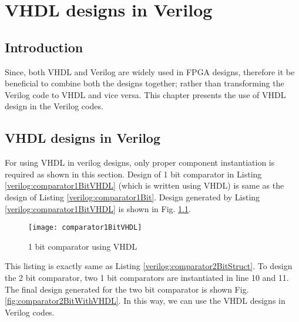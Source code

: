 \chapter{VHDL designs in Verilog} \label{ch:VerilogInVhdl}

\graphicspath{{Chapters/VhdlWithVerilog/Figures/}}


\section{Introduction}
Since, both VHDL and Verilog are widely used in FPGA designs, therefore it be beneficial to combine both the designs together; rather than transforming the Verilog code to VHDL and vice versa. This chapter presents the use of VHDL design in the Verilog codes. 

\section{VHDL designs in Verilog}

For using VHDL in verilog designs, only proper component instantiation is required as shown in this section. Design of 1 bit comparator in Listing \ref{verilog:comparator1BitVHDL} (which is written using VHDL) is same as the design of Listing \ref{verilog:comparator1Bit}. Design generated by Listing \ref{verilog:comparator1BitVHDL} is shown in Fig. \ref{fig:comparator1BitVHDL}. 


\begin{figure}[!h]
	\centering
	\texttt{[image: comparator1BitVHDL]}
	\caption{1 bit comparator using VHDL}
	\label{fig:comparator1BitVHDL}
\end{figure}

\begin{explanation}
	This listing is exactly same as Listing \ref{verilog:comparator2BitStruct}. To design the 2 bit comparator, two 1 bit comparators are instantiated in line 10 and 11. The final design generated for the two bit comparator is shown Fig. \ref{fig:comparator2BitWithVHDL}. In this way, we can use the VHDL designs in Verilog codes. 
\end{explanation}

